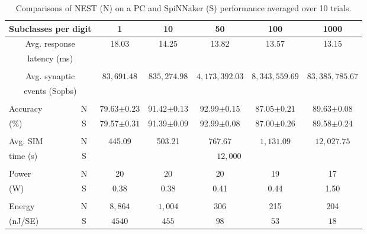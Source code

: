 \documentclass{frontiersENG} %
\begin{document}
\begin{table}[h]
	\caption{Comparisons of NEST (N) on a PC and SpiNNaker (S) performance averaged over 10 trials.}
	\begin{center}
    \bgroup
    \def\arraystretch{1.4}
		\begin{tabular} {l| c  c c c c c}
		\multicolumn{2}{c}{Subclasses per digit} 
		& 1 & 10 & 50 & 100 & 1000 \\
		\hline
		\multicolumn{2}{c}{Avg. response}
		& \multirow{2}{*}{18.03} %
		& \multirow{2}{*}{14.25} %
		& \multirow{2}{*}{13.82} %
		& \multirow{2}{*}{13.57} %
		& \multirow{2}{*}{13.15} %
		\\
		\multicolumn{2}{c}{latency (ms)}
		& & & & &
		\\
    \multicolumn{7}{c}{\vspace*{-3mm}}\\
		\multicolumn{2}{c}{Avg. synaptic}
		& \multirow{2}{*}{$83,691.48$}
		& \multirow{2}{*}{$835,274.98$}
		& \multirow{2}{*}{$4,173,392.03$}
		& \multirow{2}{*}{$8,343,559.69$}
		& \multirow{2}{*}{$83,385,785.67$}
		\\	
		\multicolumn{2}{c}{events (Sopbs)}
		& & & & &
		\\
    \multicolumn{7}{c}{\vspace*{-3mm}}\\
		Accuracy
		& N 
		& 79.63$\pm0.23$
		& 91.42$\pm0.13$ 
		& 92.99$\pm0.15$
		& 87.05$\pm0.21$
		& 89.63$\pm0.08$
		\\
		(\%)
		& S
		& 79.57$\pm0.31$
		& 91.39$\pm0.09$
		& 92.99$\pm0.08$
		& 87.00$\pm0.26$
		& 89.58$\pm0.24$
		\\
    & &\multicolumn{5}{c}{\vspace*{-4mm}}\\
		Avg. SIM
		& N 
		& 445.09
		& 503.21
		& 767.67
		& $1,131.09$
		& $12,027.75$
		\\
		time (s)
		& S
		& \multicolumn{5}{c}{$12,000$}
		\\
    & &\multicolumn{5}{c}{\vspace*{-4mm}}\\
		Power
		& N 
		& 20
		& 20
		& 20
		& 19
		& 17
		\\
		(W) %
		& S
		& 0.38 
		& 0.38 
		& 0.41
		& 0.44
		& 1.50
		\\
    & &\multicolumn{5}{c}{\vspace*{-4mm}}\\
		Energy
		& N 
		& $8,864$
		& $1,004$
		& 306
		& 215
		& 204
		\\
		(nJ/SE) %
		& S
		& $4540$
		& $ 455 $
		& $ 98 $
		& $ 53 $
		& $ 18 $
		\\
			

\end{tabular}
\end{center}
\end{table}
\end{document}
